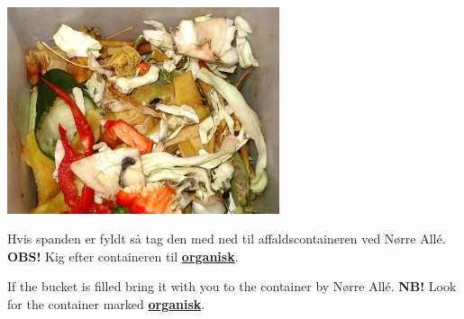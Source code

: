 \documentclass{article}
\begin{document}
\maketitle

\null

\begin{minipage}[l]{.4\textwidth}
  \includegraphics[width=8cm]{../billeder/BiodegradableWaste.jpg}
\end{minipage}
\begin{minipage}[c]{.6\textwidth}

\Large Hvis spanden er fyldt så tag den med ned til affaldscontaineren ved Nørre
Allé.\\
\textbf{OBS!} Kig efter containeren til \underline{\textbf{organisk}}.

\english
{}

\Large If the bucket is filled bring it with you to the container by Nørre Allé.
\textbf{NB!} Look for the container marked \underline{\textbf{organisk}}.
\end{minipage}

\dansk
\underskriv
\end{document}
